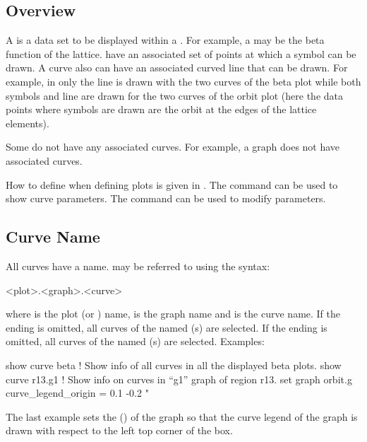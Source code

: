 {{{{{%
\subsection{Overview}
\label{s:curve.overview}

A  is a data set to be displayed within a . For example, a  may be the
beta function of the  lattice.  have an associated set of points at which a
symbol can be drawn. A curve also can have an associated curved line that can be drawn. For example,
in  only the line is drawn with the two curves of the beta plot while both symbols
and line are drawn for the two curves of the orbit plot (here the data points where symbols are
drawn are the orbit at the edges of the lattice elements).

Some  do not have any associated curves. For example, a  graph does not
have associated curves.

How to define  when defining  plots is given in . The
 command can be used to show curve parameters. The  command can
be used to modify  parameters.

\subsection{Curve Name}
\label{s:curve.name}

All curves have a name.  may be referred to using the syntax:
\begin{example}
  <plot>.<graph>.<curve>
\end{example}
where  is the plot (or ) name,  is the graph name and 
is the curve name. If the  ending is omitted, all curves of the named (s) are
selected. If the  ending is omitted, all curves of the named (s) are
selected. Examples:
\begin{example}
  show curve beta   ! Show info of all curves in all the displayed beta plots.
  show curve r13.g1 ! Show info on curves in ``g1'' graph of region r13.
  set graph orbit.g curve_legend_origin = 0.1 -0.2 "%
\end{example}
The last example sets the  () of the graph so that the curve
legend of the graph is drawn with respect to the left top corner of the box.

}}}}}
